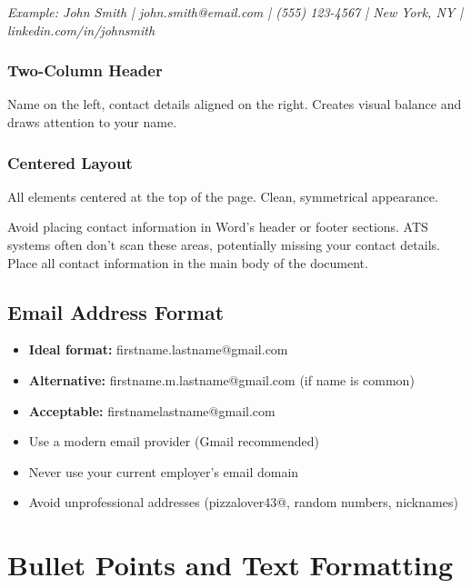 \documentclass[11pt,a4paper]{article}
\begin{document}
\textit{Example: John Smith | john.smith@email.com | (555) 123-4567 | New York, NY | linkedin.com/in/johnsmith}

\subsubsection{Two-Column Header}

Name on the left, contact details aligned on the right. Creates visual balance and draws attention to your name.

\subsubsection{Centered Layout}

All elements centered at the top of the page. Clean, symmetrical appearance.

\begin{warning}
Avoid placing contact information in Word's header or footer sections. ATS systems often don't scan these areas, potentially missing your contact details. Place all contact information in the main body of the document.
\end{warning}

\subsection{Email Address Format}

\begin{bestpractice}
\begin{itemize}[noitemsep]
    \item \textbf{Ideal format:} firstname.lastname@gmail.com
    \item \textbf{Alternative:} firstname.m.lastname@gmail.com (if name is common)
    \item \textbf{Acceptable:} firstnamelastname@gmail.com
    \item Use a modern email provider (Gmail recommended)
    \item Never use your current employer's email domain
    \item Avoid unprofessional addresses (pizzalover43@, random numbers, nicknames)
\end{itemize}
\end{bestpractice}

\section{Bullet Points and Text Formatting}
\end{document}
